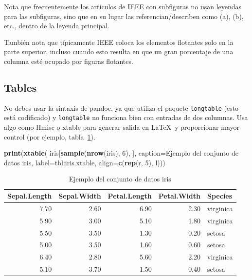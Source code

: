 \documentclass[a4paper,conference]{IEEEtran}
\newenvironment{Shaded}{\begin{snugshade}}{\end{snugshade}}
\newcommand{\AttributeTok}[1]{\textcolor[rgb]{0.13,0.29,0.53}{#1}}
\newcommand{\DecValTok}[1]{\textcolor[rgb]{0.00,0.00,0.81}{#1}}
\newcommand{\FunctionTok}[1]{\textcolor[rgb]{0.13,0.29,0.53}{\textbf{#1}}}
\newcommand{\NormalTok}[1]{#1}
\newcommand{\StringTok}[1]{\textcolor[rgb]{0.31,0.60,0.02}{#1}}
\begin{document}
Nota que frecuentemente los artículos de IEEE con subfiguras no usan
leyendas para las subfiguras, sino que en su lugar las
referencian/describen como (a), (b), etc., dentro de la leyenda
principal.

También nota que típicamente IEEE coloca los elementos flotantes solo en
la parte superior, incluso cuando esto resulta en que un gran porcentaje
de una columna esté ocupado por figuras flotantes.

\subsection{Tables}\label{sec:tables}

No debes usar la sintaxis de pandoc, ya que utiliza el paquete
\texttt{longtable} (esto está codificado) y \texttt{longtable} no
funciona bien con entradas de dos columnas. Usa algo como Hmisc o xtable
para generar salida en \LaTeX~y proporcionar mayor control (por ejemplo,
tabla~\ref{tbl:iris.xtable}).

\begin{Shaded}
\begin{Highlighting}[]
\FunctionTok{print}\NormalTok{(}\FunctionTok{xtable}\NormalTok{(}
\NormalTok{  iris[}\FunctionTok{sample}\NormalTok{(}\FunctionTok{nrow}\NormalTok{(iris), }\DecValTok{6}\NormalTok{), ],}
  \AttributeTok{caption=}\StringTok{\textquotesingle{}Ejemplo del conjunto de datos iris\textquotesingle{}}\NormalTok{,}
  \AttributeTok{label=}\StringTok{\textquotesingle{}tbl:iris.xtable\textquotesingle{}}\NormalTok{,}
  \AttributeTok{align=}\FunctionTok{c}\NormalTok{(}\FunctionTok{rep}\NormalTok{(}\StringTok{\textquotesingle{}r\textquotesingle{}}\NormalTok{, }\DecValTok{5}\NormalTok{), }\StringTok{\textquotesingle{}l\textquotesingle{}}\NormalTok{)))}
\end{Highlighting}
\end{Shaded}

\begin{table}[!t]
\centering
\caption{Ejemplo del conjunto de datos iris} 
\label{tbl:iris.xtable}
\begin{tabular}{rrrrl}
  \hline
Sepal.Length & Sepal.Width & Petal.Length & Petal.Width & Species \\ 
  \hline
7.70 & 2.60 & 6.90 & 2.30 & virginica \\ 
  5.90 & 3.00 & 5.10 & 1.80 & virginica \\ 
  5.50 & 3.50 & 1.30 & 0.20 & setosa \\ 
  5.00 & 3.50 & 1.60 & 0.60 & setosa \\ 
  6.40 & 2.80 & 5.60 & 2.20 & virginica \\ 
  5.10 & 3.70 & 1.50 & 0.40 & setosa \\ 
   \hline
\end{tabular}
\end{table}
\end{document}
